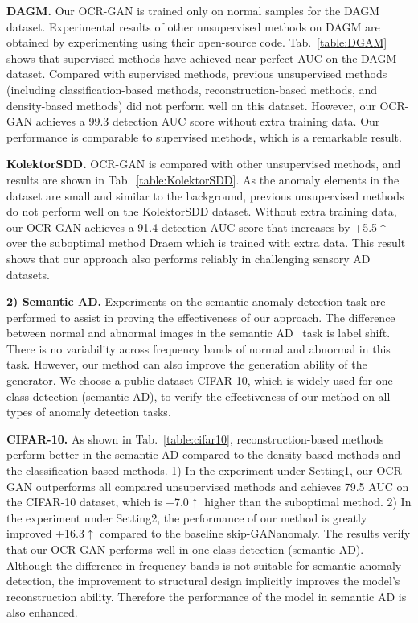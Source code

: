 \documentclass[lettersize,journal]{IEEEtran}
\begin{document}
\noindent\textbf{DAGM.} Our OCR-GAN is trained only on normal samples for the DAGM dataset.
Experimental results of other unsupervised methods on DAGM are obtained by experimenting using their open-source code. Tab.~\ref{table:DGAM} shows that supervised methods have achieved near-perfect AUC on the DAGM dataset. Compared with supervised methods, previous unsupervised methods (including classification-based methods, reconstruction-based methods, and density-based methods) did not perform well on this dataset. However, our OCR-GAN achieves a 99.3 detection AUC score without extra training data. Our performance is comparable to supervised methods, which is a remarkable result.

\noindent\textbf{KolektorSDD.} OCR-GAN is compared with other unsupervised methods, and results are shown in Tab.~\ref{table:KolektorSDD}. As the anomaly elements in the dataset are small and similar to the background, previous unsupervised methods do not perform well on the KolektorSDD dataset. Without extra training data, our OCR-GAN achieves a 91.4 detection AUC score that increases by +5.5$\uparrow$ over the suboptimal method Draem which is trained with extra data. This result shows that our approach also performs reliably in challenging sensory AD datasets.


\noindent\textbf{2) Semantic AD.} Experiments on the semantic anomaly detection task are performed to assist in proving the effectiveness of our approach. The difference between normal and abnormal images in the semantic AD~\cite{perera2019learning} task is label shift. There is no variability across frequency bands of normal and abnormal in this task. However, our method can also improve the generation ability of the generator. We choose a public dataset CIFAR-10, which is widely used for one-class detection (semantic AD), to verify the effectiveness of our method on all types of anomaly detection tasks.

\noindent\textbf{CIFAR-10.} As shown in Tab.~\ref{table:cifar10}, reconstruction-based methods perform better in the semantic AD compared to the density-based methods and the classification-based methods. 1) In the experiment under Setting1, our OCR-GAN outperforms all compared unsupervised methods and achieves 79.5 AUC on the CIFAR-10 dataset, which is +7.0$\uparrow$ higher than the suboptimal method. 2) In the experiment under Setting2, the performance of our method is greatly improved +16.3$\uparrow$ compared to the baseline skip-GANanomaly. The results verify that our OCR-GAN performs well in one-class detection (semantic AD). Although the difference in frequency bands is not suitable for semantic anomaly detection, the improvement to structural design implicitly improves the model's reconstruction ability. Therefore the performance of the model in semantic AD is also enhanced.
\end{document}
